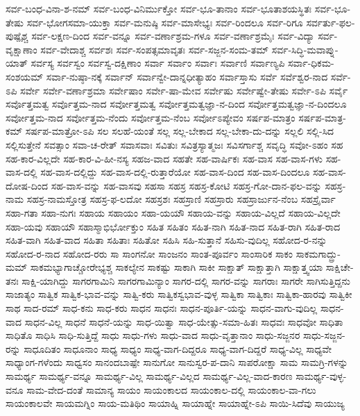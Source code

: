 {ಸರ್ವ-ಬಂಧ-ವಿನಾ-ಶ-ನಮ್
ಸರ್ವ-ಬಂಧ-ವಿನಿರ್ಮುಕ್ತೋ
ಸರ್ವ-ಭೂ-ತಾನಾಂ
ಸರ್ವ-ಭೂತಾಶಯಸ್ಥಿತಃ
ಸರ್ವ-ಭೂ-ತೇಷು
ಸರ್ವ-ಭೋಗಸಮಾ-ಯುಕ್ತಾ
ಸರ್ವ-ಮನುಷ್ಠಿ
ಸರ್ವ-ಮಾಸೇಭ್ಯಃ
ಸರ್ವ-ರಿಂದಲೂ
ಸರ್ವ-ರಿಗೂ
ಸರ್ವರ್ತು-ಫಲ-ಪುಷ್ಪೈಶ್ಚ
ಸರ್ವ-ಲಕ್ಷಣ-ದಿಂದ
ಸರ್ವ-ವನ್ನೂ
ಸರ್ವ-ವರ್ಣಾಶ್ರಮ-ಗಳೂ
ಸರ್ವ-ವರ್ಣಾಶ್ರಮೈಃ
ಸರ್ವ-ವಿದ್ಯಾ
ಸರ್ವ-ವೃಕ್ಷಾಣಾಂ
ಸರ್ವ-ವೇದಾಶ್ಚ
ಸರ್ವಶಃ
ಸರ್ವ-ಸಂಪತ್ಸಮಾವೃತಃ
ಸರ್ವ-ಸಜ್ಜನ-ಸಂಮ-ತಮ್
ಸರ್ವ-ಸಿದ್ಧಿ-ಮವಾಪ್ನು-ಯಾತ್
ಸರ್ವಸ್ಯ
ಸರ್ವಸ್ವಂ
ಸರ್ವಸ್ವ-ದಕ್ಷಿಣಾಂ
ಸರ್ವಾ
ಸರ್ವಾಂ
ಸರ್ವಾಃ
ಸರ್ವಾಣಿ
ಸರ್ವಾಣ್ಯಪಿ
ಸರ್ವಾ-ಧಿಕಮ-ಸಂಶಯಮ್
ಸರ್ವಾ-ನುಷ್ಠಾ-ನಕ್ಕೆ
ಸರ್ವಾನ್
ಸರ್ವಾನ್ವೇ-ದಾನ್ನಧೀತ್ಯಾಹಂ
ಸರ್ವಾಸ್ತಾಸು
ಸರ್ವೆ
ಸರ್ವೆಶ್ವರ-ನಾದ
ಸರ್ವೆ-ಽಪಿ
ಸರ್ವೇ
ಸರ್ವೇ-ವರ್ಣಾಶ್ರಮಾ
ಸರ್ವೇಷಾಂ
ಸರ್ವೇ-ಷಾ-ಮೇವ
ಸರ್ವೇಷು
ಸರ್ವೇಷ್ವೇ-ತೇಷು
ಸರ್ವೇ-ಽಪಿ
ಸರ್ವೈ
ಸರ್ವೊತ್ತಮತ್ವ
ಸರ್ವೊತ್ತಮ-ನಾದ
ಸರ್ವೋತ್ತಮತ್ವ
ಸರ್ವೋತ್ತಮತ್ವಜ್ಞಾ-ನ-ದಿಂದ
ಸರ್ವೋತ್ತಮತ್ವಜ್ಞಾ-ನ-ದಿಂದಲೂ
ಸರ್ವೋತ್ತಮ-ನಾದ
ಸರ್ವೋತ್ತಮ-ನೆಂದು
ಸರ್ವೋತ್ತಮ-ನೆಂಬ
ಸರ್ವೋಽಪ್ಯೇವಂ
ಸರ್ಷಪ-ಮಾತ್ರಂ
ಸರ್ಷಪ-ಮಾತ್ರ-ಕಮ್
ಸರ್ಷಪ-ಮಾತ್ರೋ-ಽಪಿ
ಸಲ
ಸಲಹೆ-ಯಂತೆ
ಸಲ್ಲ
ಸಲ್ಲ-ಬೇಕಾದ
ಸಲ್ಲ-ಬೇಕಾ-ದು-ದನ್ನು
ಸಲ್ಲಲಿ
ಸಲ್ಲಿ-ಸಿದ
ಸಲ್ಲಿಸುತ್ತೇನೆ
ಸವತ್ಸಾಂ
ಸವಾ-ಚ-ರೇತ್
ಸವಾಸವಾಃ
ಸವಿತುಃ
ಸವಿತ್ರಸ್ಯಾತ್ಮಜಃ
ಸವಿಸರ್ಗಾಶ್ಚ
ಸವೃದ್ಧಿ
ಸವೋ-ಽಹಂ
ಸಹ
ಸಹ-ಕಾರ-ವಿಲ್ಲದೇ
ಸಹ-ಕಾರ-ವಿ-ಹೀ-ನಸ್ಯ
ಸಹಜ-ವಾದ
ಸಹತೇ
ಸಹ-ವಾರ್ಷಿಕಃ
ಸಹ-ವಾಸ
ಸಹ-ವಾಸ-ಗಳು
ಸಹ-ವಾಸ-ದಲ್ಲಿ
ಸಹ-ವಾಸ-ದಲ್ಲಿದ್ದು
ಸಹ-ವಾಸ-ದಲ್ಲಿ-ರುತ್ತಾರೆಯೋ
ಸಹ-ವಾಸ-ದಿಂದ
ಸಹ-ವಾಸ-ದಿಂದಲೂ
ಸಹ-ವಾಸ-ದೋಷ-ದಿಂದ
ಸಹ-ವಾಸ-ವನ್ನು
ಸಹ-ವಾಸವು
ಸಹಸಾ
ಸಹಸ್ರ
ಸಹಸ್ರ-ಕೋಟಿ
ಸಹಸ್ರ-ಗೋ-ದಾನ-ಫಲ-ವನ್ನು
ಸಹಸ್ರ-ನಾಮ
ಸಹಸ್ರ-ನಾಮಸ್ತೋತ್ರ
ಸಹಸ್ರ-ಫ-ಲದೋ
ಸಹಸ್ರಶಃ
ಸಹಸ್ರಾಣಿ
ಸಹಸ್ರಾರು
ಸಹಸ್ರಾರ್ಜುನ-ನೆಂಬ
ಸಹಸ್ರೈರ್ವಾ
ಸಹಾ-ಗತಾ
ಸಹಾ-ನುಗಃ
ಸಹಾಯ
ಸಹಾಯಂ
ಸಹಾ-ಯಯೌ
ಸಹಾಯ-ವನ್ನು
ಸಹಾಯ-ವಿಲ್ಲದೆ
ಸಹಾಯ-ವಿಲ್ಲದೇ
ಸಹಾ-ಯವು
ಸಹಾಯೌ
ಸಹಾಸ್ಮಾಭಿರ್ಭೋಕ್ತುಂ
ಸಹಿತ
ಸಹಿತಂ
ಸಹಿತ-ನಾಗಿ
ಸಹಿತ-ನಾದ
ಸಹಿತ-ರಾಗಿ
ಸಹಿತ-ರಾದ
ಸಹಿತ-ವಾಗಿ
ಸಹಿತ-ವಾದ
ಸಹಿತಾ
ಸಹಿತಾಃ
ಸಹಿತೋ
ಸಹಿಸಿ
ಸಹಿ-ಸುತ್ತಾನೆ
ಸಹಿಸು-ವುದಿಲ್ಲ
ಸಹೋದ-ರ-ನನ್ನು
ಸಹೋದ-ರ-ನಾದ
ಸಹೋದ-ರರು
ಸಾ
ಸಾಂಗನೋ
ಸಾಂಜನಂ
ಸಾಂತ-ಪೂರ್ವಂ
ಸಾಂಸಾರಿಕ
ಸಾಕಂ
ಸಾಕಮಗಾದ್ದ್ರು-ಮಮ್
ಸಾಕಮಭ್ಯಾಗಾಚ್ಚೋರೇಭ್ಯಶ್ಚ
ಸಾಕಲ್ಯೇನ
ಸಾಕಷ್ಟು
ಸಾಕಾಗಿ
ಸಾಕೀ
ಸಾಕ್ಷಾತ್
ಸಾಕ್ಷಾತ್ತಾಗಿ
ಸಾಕ್ಷಾತ್ತ್ವಯಾ
ಸಾಕ್ಷಿಚೇ-ತನಃ
ಸಾಕ್ಷಿ-ಯಾಗಿದ್ದು
ಸಾಗರಗಾಮಿನಿ
ಸಾಗರಗಾಮಿನ್ಯಾಂ
ಸಾಗರ-ದಲ್ಲಿ
ಸಾಗರ-ವನ್ನು
ಸಾಗರಾಃ
ಸಾಗರೇ
ಸಾಗಿಸುತ್ತಿದ್ದನು
ಸಾಜಾತ್ಯಂ
ಸಾತ್ವಿಕ
ಸಾತ್ವಿಕ-ಭಾವ-ವನ್ನು
ಸಾತ್ವಿ-ಕರು
ಸಾತ್ವಿಕಸ್ವಭಾವ-ವುಳ್ಳ
ಸಾತ್ವಿಕಾ
ಸಾತ್ವಿಕಾಃ
ಸಾತ್ವಿಕಾ-ಹಾರವು
ಸಾತ್ವಿಕೀ
ಸಾಥ
ಸಾದ-ರಮ್
ಸಾಧ-ಕನು
ಸಾಧ-ಕರು
ಸಾಧನ
ಸಾಧನಃ
ಸಾಧನ-ಪೂರ್ತಿ-ಯನ್ನು
ಸಾಧನ-ವಾಗು-ವುದಿಲ್ಲ
ಸಾಧನ-ವಾದ
ಸಾಧನ-ವಿಲ್ಲ
ಸಾಧನೆ
ಸಾಧನೆ-ಯನ್ನು
ಸಾಧ-ಯಿತ್ವಾ
ಸಾಧ-ಯೇತ್ಸು-ಸಮಾ-ಹಿತಃ
ಸಾಧವಃ
ಸಾಧವೋ
ಸಾಧಿತಾ
ಸಾಧಿತೊ
ಸಾಧಿಸಿ
ಸಾಧಿ-ಸುತ್ತಿದ್ದೆ
ಸಾಧು
ಸಾಧು-ಗಳು
ಸಾಧು-ವಾದ
ಸಾಧು-ವೃತ್ತಾನಾಂ
ಸಾಧು-ಸಜ್ಜನರ
ಸಾಧು-ಸಜ್ಜನ-ರನ್ನು
ಸಾಧೂದಿತಂ
ಸಾಧೂನಾಂ
ಸಾಧ್ಯ
ಸಾಧ್ಯಂ
ಸಾಧ್ಯ-ವಾಗ-ದಿದ್ದರೂ
ಸಾಧ್ಯ-ವಾಗ-ದಿದ್ದರೆ
ಸಾಧ್ಯ-ವಿಲ್ಲ
ಸಾಧ್ಯವೇ
ಸಾಧ್ಯಾಂಗ-ಗಳೆಂದು
ಸಾಧ್ವಸಂ
ಸಾನಂದಬಾಷ್ಪೇ
ಸಾನುಗೋ
ಸಾನುಸ್ವರ-ಪ-ದಾನಿ
ಸಾಪರೋಕ್ಷಾ
ಸಾಮ
ಸಾಮಗ್ರಿ-ಗಳನ್ನು
ಸಾಮರ್ಥ್ಯ
ಸಾಮರ್ಥ್ಯ-ವನ್ನೂ
ಸಾಮರ್ಥ್ಯ-ವಿಲ್ಲ
ಸಾಮರ್ಥ್ಯ-ವಿಲ್ಲದ
ಸಾಮರ್ಥ್ಯ-ವಿಲ್ಲ-ವಾದ-ಕಾರಣ
ಸಾಮರ್ಥ್ಯ-ವುಳ್ಳ-ವನೂ
ಸಾಮ-ವೇದ-ದಂತೆ
ಸಾಮಾನ್ಯ
ಸಾಯಂ
ಸಾಯಂಕಾಲದ
ಸಾಯಂಕಾಲ-ದಲ್ಲಿ
ಸಾಯಂಕಾಲ-ವಾ-ಗಲು
ಸಾಯಂಕಾಲವೇ
ಸಾಯಮಗ್ನಿಂ
ಸಾಯ-ಮತಿಥಿಂ
ಸಾಯಾಹ್ನಿ
ಸಾಯಾಹ್ನೇ
ಸಾಯಾಹ್ನೇ-ಽಪಿ
ಸಾಯಿ-ಸಿದೆವು
ಸಾಯುಜ್ಯ
}
